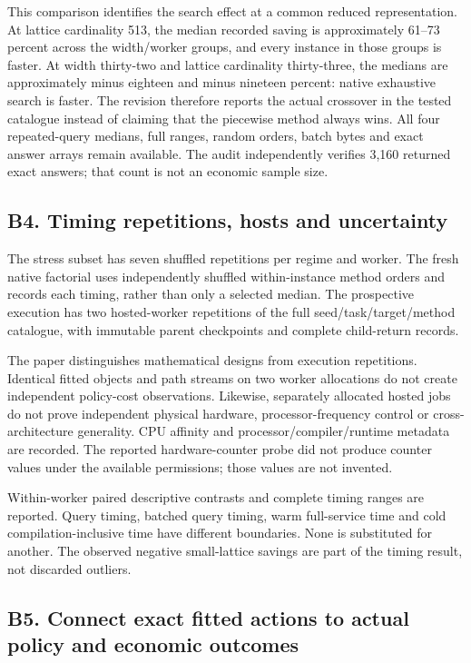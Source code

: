 This comparison identifies the search effect at a common reduced
representation. At lattice cardinality 513, the median recorded saving
is approximately 61--73 percent across the width/worker groups, and
every instance in those groups is faster. At width thirty-two and
lattice cardinality thirty-three, the medians are approximately minus
eighteen and minus nineteen percent: native exhaustive search is faster.
The revision therefore reports the actual crossover in the tested
catalogue instead of claiming that the piecewise method always wins. All
four repeated-query medians, full ranges, random orders, batch bytes and
exact answer arrays remain available. The audit independently verifies
3,160 returned exact answers; that count is not an economic sample size.

\hypertarget{b4.-timing-repetitions-hosts-and-uncertainty}{%
\subsection{B4. Timing repetitions, hosts and
uncertainty}\label{b4.-timing-repetitions-hosts-and-uncertainty}}

The stress subset has seven shuffled repetitions per regime and worker.
The fresh native factorial uses independently shuffled within-instance
method orders and records each timing, rather than only a selected
median. The prospective execution has two hosted-worker repetitions of
the full seed/task/target/method catalogue, with immutable parent
checkpoints and complete child-return records.

The paper distinguishes mathematical designs from execution repetitions.
Identical fitted objects and path streams on two worker allocations do
not create independent policy-cost observations. Likewise, separately
allocated hosted jobs do not prove independent physical hardware,
processor-frequency control or cross-architecture generality. CPU
affinity and processor/compiler/runtime metadata are recorded. The
reported hardware-counter probe did not produce counter values under the
available permissions; those values are not invented.

Within-worker paired descriptive contrasts and complete timing ranges
are reported. Query timing, batched query timing, warm full-service time
and cold compilation-inclusive time have different boundaries. None is
substituted for another. The observed negative small-lattice savings are
part of the timing result, not discarded outliers.

\hypertarget{b5.-connect-exact-fitted-actions-to-actual-policy-and-economic-outcomes}{%
\subsection{B5. Connect exact fitted actions to actual policy and
economic
outcomes}\label{b5.-connect-exact-fitted-actions-to-actual-policy-and-economic-outcomes}}

